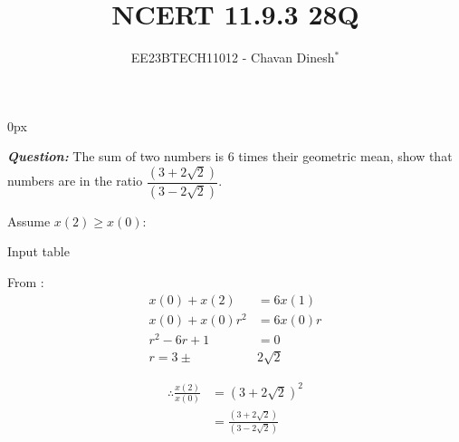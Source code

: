 \documentclass[journal,12pt,twocolumn]{IEEEtran}
\theoremstyle{remark}
\begin{document}
\parindent 0px

\vspace{3cm}

\title{NCERT 11.9.3 28Q}
\author{EE23BTECH11012 - Chavan Dinesh$^{*}$%
}
\maketitle
\newpage
\bigskip

\renewcommand{\thefigure}{\arabic{figure}}
\renewcommand{\thetable}{\arabic{table}}
\large\textbf{\textsl{Question:}}
The sum of two numbers is $6$ times their geometric mean, show that numbers are in the ratio $\dfrac{(3+2\sqrt{2})}{(3-2\sqrt{2})}$.

\solution
Assume $x(2)\geq x(0)$:
\begin{table}[htbp]
    \centering
    
    \caption{Input table}
    \label{tab:parameter_table.11.9.3.28}
\end{table}

From :
\begin{align}
x(0) + x(2) &= 6x(1) \\
x(0) + x(0)r^2 &= 6x(0)r \\
r^2 - 6r +1 &= 0 \\
r = 3\pm &2\sqrt{2}
\end{align}

\begin{align}
    \therefore \frac{x(2)}{x(0)} &= (3 + 2\sqrt{2})^2 \\
    &=  \frac{(3+2\sqrt{2})}{(3-2\sqrt{2})}
\end{align}


\end{document}
